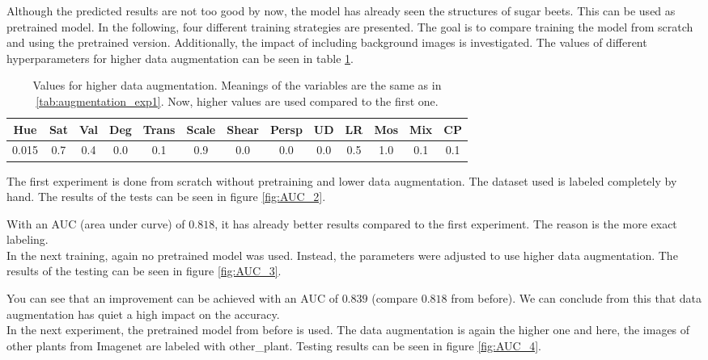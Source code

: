 Although the predicted results are not too good by now, the model has already seen the structures of sugar beets. This can be used as pretrained model. In the following, four different training strategies are presented. The goal is to compare training the model from scratch and using the pretrained version. Additionally, the impact of including background images is investigated. The values of different hyperparameters for higher data augmentation can be seen in table \ref{tab:high_augmentation}.

\begin{table}[h!]
	\centering
	\begin{tabular}{|c c c c c c c c c c c c c|} 
		\hline
		Hue & Sat & Val & Deg & Trans & Scale & Shear & Persp & UD & LR & Mos & Mix & CP\\ %
		\hline
		0.015 & 0.7 & 0.4 & 0.0 & 0.1 & 0.9 & 0.0 & 0.0 & 0.0 & 0.5 & 1.0 & 0.1 & 0.1\\
		\hline
	\end{tabular}
	\caption{Values for higher data augmentation. Meanings of the variables are the same as in \ref{tab:augmentation_exp1}. Now, higher values are used compared to the first one.}
	\label{tab:high_augmentation}
\end{table}

The first experiment is done from scratch without pretraining and lower data augmentation. The dataset used is labeled completely by hand. The results of the tests can be seen in figure \ref{fig:AUC_2}.


With an AUC (area under curve) of $ 0.818 $, it has already better results compared to the first experiment. The reason is the more exact labeling. \\

In the next training, again no pretrained model was used. Instead, the parameters were adjusted to use higher data augmentation. The results of the testing can be seen in figure \ref{fig:AUC_3}.


You can see that an improvement can be achieved with an AUC of $ 0.839 $ (compare $ 0.818 $ from before). We can conclude from this that data augmentation has quiet a high impact on the accuracy. \\

In the next experiment, the pretrained model from before is used. The data augmentation is again the higher one and here, the images of other plants from Imagenet are labeled with other\_plant. Testing results can be seen in figure \ref{fig:AUC_4}.

